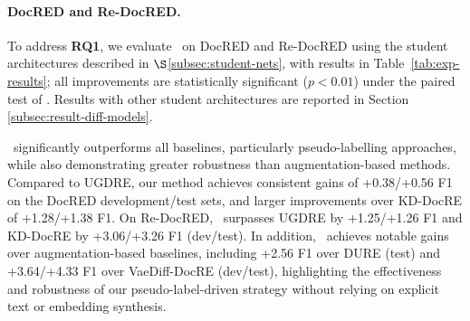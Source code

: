 \paragraph{DocRED and Re-DocRED.}
To address \textbf{RQ1}, we evaluate \model\ on DocRED and Re-DocRED using the student architectures described in $\S$\ref{subsec:student-nets}, with results in Table~\ref{tab:exp-results}; all improvements are statistically significant ($p < 0.01$) under the paired test of \citet{dror2018hitchhiker}. Results with other student architectures are reported in Section \ref{subsec:result-diff-models}.



\model\ significantly outperforms all baselines, particularly pseudo-labelling approaches, while also demonstrating greater robustness than augmentation-based methods. Compared to UGDRE, our method achieves consistent gains of +0.38/+0.56 F1 on the DocRED development/test sets, and larger improvements over KD-DocRE of +1.28/+1.38 F1. On Re-DocRED, \model\ surpasses UGDRE by +1.25/+1.26 F1 and KD-DocRE by +3.06/+3.26 F1 (dev/test). In addition, \model\ achieves notable gains over augmentation-based baselines, including +2.56 F1 over DURE (test) and +3.64/+4.33 F1 over VaeDiff-DocRE (dev/test), highlighting the effectiveness and robustness of our pseudo-label-driven strategy without relying on explicit text or embedding synthesis.

